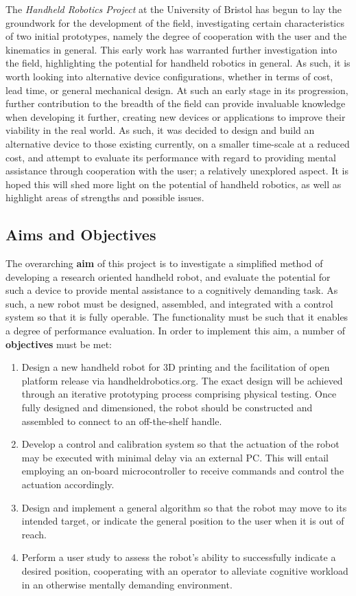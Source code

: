 \documentclass[11pt]{article}
\begin{document}
The \textit{Handheld Robotics Project} at the University of Bristol has begun to lay the groundwork for the development of the field, investigating certain characteristics of two initial prototypes, namely the degree of cooperation with the user and the kinematics in general. This early work has warranted further investigation into the field, highlighting the potential for handheld robotics in general. As such, it is worth looking into alternative device configurations, whether in terms of cost, lead time, or general mechanical design. At such an early stage in its progression, further contribution to the breadth of the field can provide invaluable knowledge when developing it further, creating new devices or applications to improve their viability in the real world. As such, it was decided to design and build an alternative device to those existing currently, on a smaller time-scale at a reduced cost, and attempt to evaluate its performance with regard to providing mental assistance through cooperation with the user; a relatively unexplored aspect. It is hoped this will shed more light on the potential of handheld robotics, as well as highlight areas of strengths and possible issues.




\subsection{Aims and Objectives}
The overarching \textbf{aim} of this project is to investigate a simplified method of developing a research oriented handheld robot, and evaluate the potential for such a device to provide mental assistance to a cognitively demanding task. As such, a new robot must be designed, assembled, and integrated with a control system so that it is fully operable. The functionality must be such that it enables a degree of performance evaluation. In order to implement this aim, a number of \textbf{objectives} must be met:
\begin{enumerate}
\item{Design a new handheld robot for 3D printing and the facilitation of open platform release via handheldrobotics.org. The exact design will be achieved through an iterative prototyping process comprising physical testing. Once fully designed and dimensioned, the robot should be constructed and assembled to connect to an off-the-shelf handle.}
\item{Develop a control and calibration system so that the actuation of the robot may be executed with minimal delay via an external PC. This will entail employing an on-board microcontroller to receive commands and control the actuation accordingly.}
\item{Design and implement a general algorithm so that the robot may move to its intended target, or indicate the general position to the user when it is out of reach.}
\item{Perform a user study to assess the robot's ability to successfully indicate a desired position, cooperating with an operator to alleviate cognitive workload in an otherwise mentally demanding environment.}
\end{enumerate}
\end{document}
